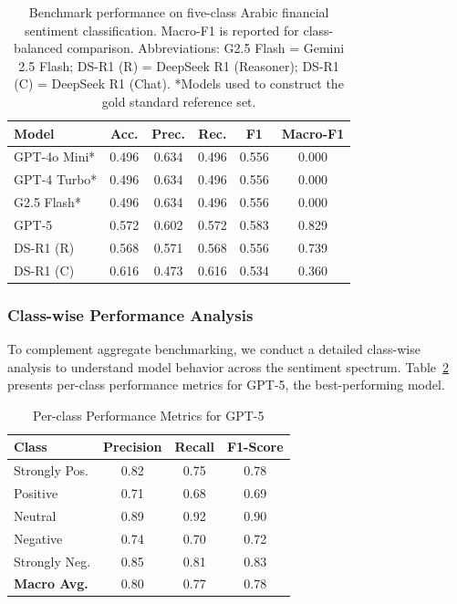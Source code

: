 \documentclass[10pt,a4paper]{article}
\begin{document}


\begin{table}[!ht]
\begin{center}
\setlength{\tabcolsep}{4pt}
\begin{tabular}{lccccc}
\hline
Model & Acc. & Prec. & Rec. & F1 & Macro-F1 \\
\hline
GPT-4o Mini* & 0.496 & 0.634 & 0.496 & 0.556 & 0.000 \\
GPT-4 Turbo* & 0.496 & 0.634 & 0.496 & 0.556 & 0.000 \\
G2.5 Flash* & 0.496 & 0.634 & 0.496 & 0.556 & 0.000 \\
GPT-5 & 0.572 & 0.602 & 0.572 & 0.583 & 0.829 \\
DS-R1 (R) & 0.568 & 0.571 & 0.568 & 0.556 & 0.739 \\
DS-R1 (C) & 0.616 & 0.473 & 0.616 & 0.534 & 0.360 \\
\hline
\end{tabular}
\caption{Benchmark performance on five-class Arabic financial sentiment classification. Macro-F1 is reported for class-balanced comparison. Abbreviations: G2.5 Flash = Gemini 2.5 Flash; DS-R1 (R) = DeepSeek R1 (Reasoner); DS-R1 (C) = DeepSeek R1 (Chat). *Models used to construct the gold standard reference set.}
\label{tab:sentiment_macro_f1}
\end{center}
\end{table}

\subsubsection{Class-wise Performance Analysis}
To complement aggregate benchmarking, we conduct a detailed class-wise analysis to understand model behavior across the sentiment spectrum. Table~\ref{tab:classwise_gpt5} presents per-class performance metrics for GPT-5, the best-performing model.

\begin{table}[!ht]
\begin{center}
\begin{tabular}{lccc}
\hline
\textbf{Class} & \textbf{Precision} & \textbf{Recall} & \textbf{F1-Score} \\
\hline
Strongly Pos. & 0.82 & 0.75 & 0.78 \\
Positive & 0.71 & 0.68 & 0.69 \\
Neutral & 0.89 & 0.92 & 0.90 \\
Negative & 0.74 & 0.70 & 0.72 \\
Strongly Neg. & 0.85 & 0.81 & 0.83 \\
\hline
\textbf{Macro Avg.} & 0.80 & 0.77 & 0.78 \\
\hline
\end{tabular}
\caption{Per-class Performance Metrics for GPT-5}
\label{tab:classwise_gpt5}
\end{center}
\end{table}
\end{document}
